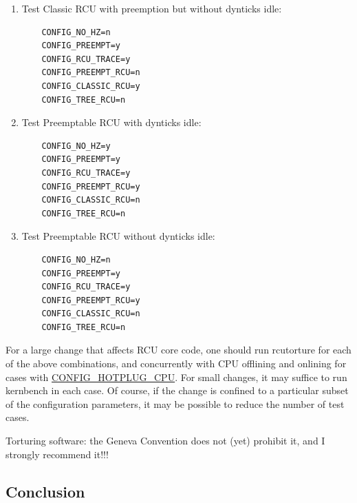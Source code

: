\begin{enumerate}
\item	Test Classic RCU with preemption but without dynticks idle:

\vspace{5pt}
\begin{minipage}[t]{\columnwidth}
\small
\begin{verbatim}
	CONFIG_NO_HZ=n
	CONFIG_PREEMPT=y
	CONFIG_RCU_TRACE=y
	CONFIG_PREEMPT_RCU=n
	CONFIG_CLASSIC_RCU=y
	CONFIG_TREE_RCU=n
\end{verbatim}
\end{minipage}
\vspace{5pt}

\item	Test Preemptable RCU with dynticks idle:

\vspace{5pt}
\begin{minipage}[t]{\columnwidth}
\small
\begin{verbatim}
	CONFIG_NO_HZ=y
	CONFIG_PREEMPT=y
	CONFIG_RCU_TRACE=y
	CONFIG_PREEMPT_RCU=y
	CONFIG_CLASSIC_RCU=n
	CONFIG_TREE_RCU=n
\end{verbatim}
\end{minipage}
\vspace{5pt}
\item	Test Preemptable RCU without dynticks idle:

\vspace{5pt}

\begin{minipage}[t]{\columnwidth}
\small
\begin{verbatim}
	CONFIG_NO_HZ=n
	CONFIG_PREEMPT=y
	CONFIG_RCU_TRACE=y
	CONFIG_PREEMPT_RCU=y
	CONFIG_CLASSIC_RCU=n
	CONFIG_TREE_RCU=n
\end{verbatim}
\end{minipage}
\vspace{5pt}
\end{enumerate}

For a large change that affects RCU core code, one should run
rcutorture for each of the above combinations, and concurrently
with CPU offlining and onlining for cases with
\url{CONFIG_HOTPLUG_CPU}.
For small changes, it may suffice to run kernbench in each case.
Of course, if the change is confined to a particular subset of
the configuration parameters, it may be possible to reduce the
number of test cases.

Torturing software: the Geneva Convention does not (yet) prohibit
it, and I strongly recommend it!!!

\subsection{Conclusion}
\label{app:rcuimpl:rcutree:Conclusion}

